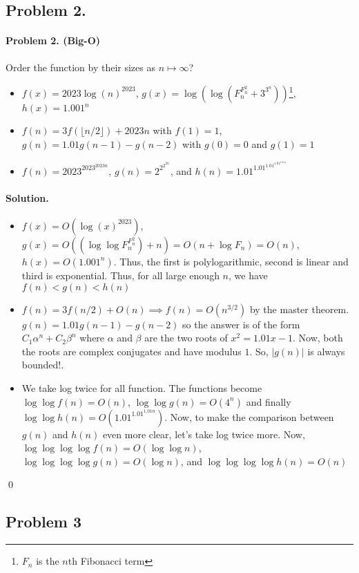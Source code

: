 \documentclass[12pt]{article}
\newenvironment{solution}
{\paragraph{Solution.}}
{\qed\eject}
\begin{document}
\subsection*{Problem 2.}

\paragraph*{\textbf{Problem 2.} (Big-O)} Order the function by their sizes as $n\mapsto \infty$?
\begin{itemize}
    \item $f(x)=2023\log(n)^{2023}$, $g(x)=\log(\log(F_n^{F_n^2}+3^{3^n}))$\footnote{$F_n$ is the $n$th Fibonacci term}, $h(x)=1.001^n$
    \item $f(n)=3f\left(\lfloor{} n/2\rfloor{}\right)+2023n$ with $f(1)=1$, $g(n)=1.01g(n-1)-g(n-2)$ with $g(0)=0$ and $g(1)=1$
    \item $f(n)=2023^{2023^{2023n}}$, $g(n)=2^{2^{2^{2n}}}$, and $h(n)=1.01^{1.01^{1.01^{1.01^{1.01n}}}}$  
\end{itemize} 

\begin{solution}
    \begin{itemize}
        \item $f(x)=O(\log(x)^{2023})$, $g(x)=O\left(\left(\log\log F_n^{F_n^2}\right)+n\right)=O(n+\log F_n)=O(n)$, $h(x)=O(1.001^n)$. Thus, the first is polylogarithmic, second is linear and third is exponential. Thus, for all large enough $n$, we have $f(n)<g(n)<h(n)$
        \item $f(n)=3f(n/2)+O(n)\implies f(n)=O(n^{3/2})$ by the master theorem. $g(n)=1.01g(n-1)-g(n-2)$ so the answer is of the form $C_1\alpha^n+C_2\beta^n$ where $\alpha$ and $\beta$ are the two roots of $x^{2}=1.01x-1$. Now, both the roots are complex conjugates and have modulus $1$. So, $|g(n)|$ is always bounded!.  
        \item We take log twice for all function. The functions become $\log\log f(n)=O(n)$, $\log\log g(n)=O(4^n)$ and finally $\log\log h(n)=O(1.01^{1.01^{1.01n}})$. Now, to make the comparison between $g(n)$ and $h(n)$ even more clear, let's take log twice more. Now, $\log \log \log \log f(n)=O(\log\log n)$, $\log \log \log \log g(n)=O(\log n)$, and $\log \log \log \log h(n)=O(n)$ 
    \end{itemize}
\end{solution}

\subsection*{Problem 3}
\end{document}
